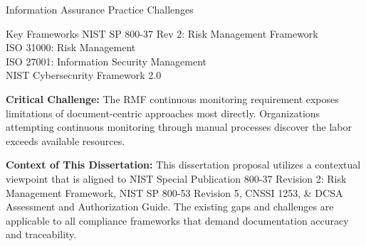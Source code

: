 \documentclass{beamer}
\begin{document}
\begin{frame}[allowframebreaks]{Information Assurance Practice Challenges}
  \begin{block}{Key Frameworks}
    NIST SP 800-37 Rev 2: Risk Management Framework \\ ISO 31000: Risk Management \\ISO 27001: Information Security Management \\ NIST Cybersecurity Framework 2.0
  \end{block}

  \vspace{0.5cm}

  \textbf{Critical Challenge:} The RMF continuous monitoring requirement exposes limitations of document-centric approaches most directly. Organizations attempting continuous monitoring through manual processes discover the labor exceeds available resources.

  \vspace{2.5cm}

  \textbf{Context of This Dissertation:} This dissertation proposal utilizes a contextual viewpoint that is aligned to NIST Special Publication 800-37 Revision 2: Risk Management Framework, NIST SP 800-53 Revision 5, CNSSI 1253, \& DCSA Assessment and Authorization Guide. The existing gaps and challenges are applicable to all compliance frameworks that demand documentation accuracy and traceability.
\end{frame}
\end{document}
